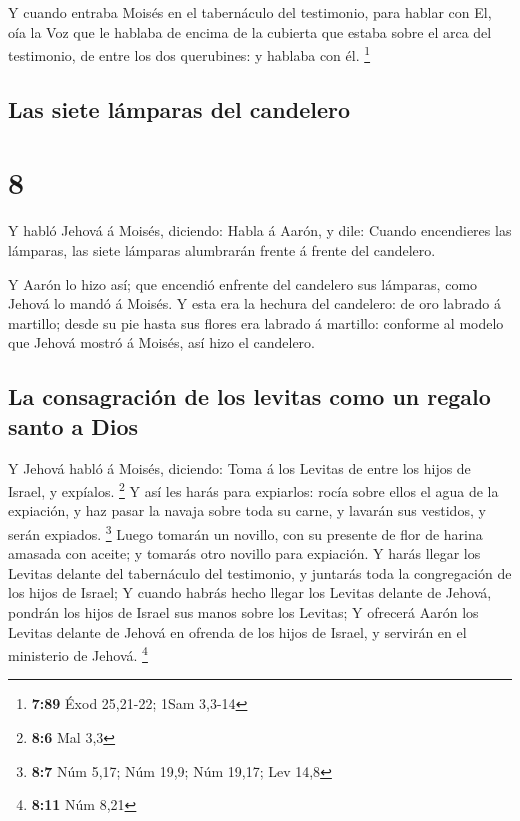  Y cuando entraba Moisés en el tabernáculo del testimonio,
para hablar con El, oía la Voz que le hablaba de encima de la cubierta
que estaba sobre el arca del testimonio, de entre los dos querubines: y
hablaba con él. \footnote{\textbf{7:89} Éxod 25,21-22; 1Sam 3,3-14}

\hypertarget{las-siete-luxe1mparas-del-candelero}{%
\subsection{Las siete lámparas del
candelero}\label{las-siete-luxe1mparas-del-candelero}}

\hypertarget{section-7}{%
\section{8}\label{section-7}}

 Y habló Jehová á Moisés, diciendo:  Habla á
Aarón, y dile: Cuando encendieres las lámparas, las siete lámparas
alumbrarán frente á frente del candelero.

 Y Aarón lo hizo así; que encendió enfrente del candelero
sus lámparas, como Jehová lo mandó á Moisés.  Y esta era la
hechura del candelero: de oro labrado á martillo; desde su pie hasta sus
flores era labrado á martillo: conforme al modelo que Jehová mostró á
Moisés, así hizo el candelero.

\hypertarget{la-consagraciuxf3n-de-los-levitas-como-un-regalo-santo-a-dios}{%
\subsection{La consagración de los levitas como un regalo santo a
Dios}\label{la-consagraciuxf3n-de-los-levitas-como-un-regalo-santo-a-dios}}

 Y Jehová habló á Moisés, diciendo:  Toma á los
Levitas de entre los hijos de Israel, y expíalos. \footnote{\textbf{8:6}
  Mal 3,3}  Y así les harás para expiarlos: rocía sobre
ellos el agua de la expiación, y haz pasar la navaja sobre toda su
carne, y lavarán sus vestidos, y serán expiados. \footnote{\textbf{8:7}
  Núm 5,17; Núm 19,9; Núm 19,17; Lev 14,8}  Luego tomarán un
novillo, con su presente de flor de harina amasada con aceite; y tomarás
otro novillo para expiación.  Y harás llegar los Levitas
delante del tabernáculo del testimonio, y juntarás toda la congregación
de los hijos de Israel;  Y cuando habrás hecho llegar los
Levitas delante de Jehová, pondrán los hijos de Israel sus manos sobre
los Levitas;  Y ofrecerá Aarón los Levitas delante de
Jehová en ofrenda de los hijos de Israel, y servirán en el ministerio de
Jehová. \footnote{\textbf{8:11} Núm 8,21}

